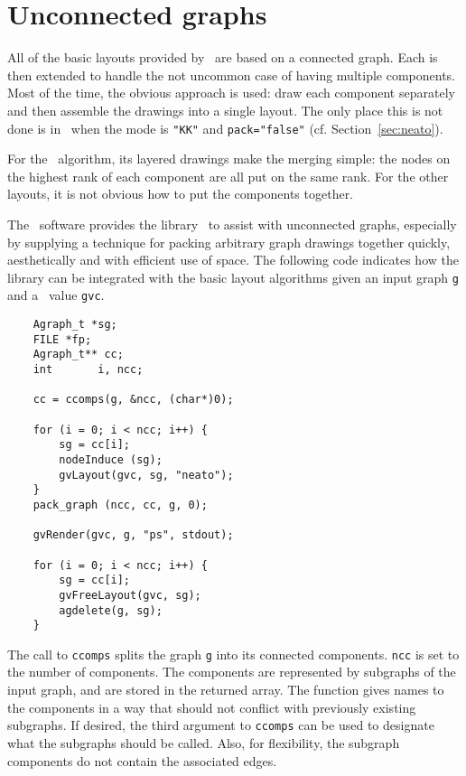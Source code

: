 \section{Unconnected graphs}
\label{sec:unconnect}
All of the basic layouts provided by \gviz\ are based on a connected graph.
Each is then extended to handle the not uncommon case of having
multiple components. Most of the time, the obvious approach is used:
draw each component separately and then assemble the drawings into a single
layout. The only place this is not done is in \neato\ when the mode is
{\tt "KK"} and {\tt pack="false"} (cf. Section~\ref{sec:neato}).

For the \dot\ algorithm, its layered drawings make the merging simple:
the nodes on the highest rank of each component are all put
on the same rank. For the other layouts, it is not obvious how to put
the components together. 

The \gviz\ software provides the library \pack\ to assist
with unconnected graphs, especially by supplying a technique for
packing arbitrary graph drawings together quickly, aesthetically and
with efficient use of space. The following code indicates how the
library can be integrated with the 
basic layout algorithms given an input graph {\tt g} and a \gvc\ value
{\tt gvc}.

\begin{verbatim}
    Agraph_t *sg;
    FILE *fp;
    Agraph_t** cc;
    int       i, ncc;

    cc = ccomps(g, &ncc, (char*)0);

    for (i = 0; i < ncc; i++) {
	    sg = cc[i];
        nodeInduce (sg);
        gvLayout(gvc, sg, "neato");
    }
    pack_graph (ncc, cc, g, 0);

    gvRender(gvc, g, "ps", stdout);

    for (i = 0; i < ncc; i++) {
        sg = cc[i];
        gvFreeLayout(gvc, sg);
        agdelete(g, sg);
    }
\end{verbatim}

The call to {\tt ccomps} splits the graph {\tt g} into its connected
components. {\tt ncc} is set to the number of components. 
The components are represented by subgraphs of the input graph, and are
stored in the returned array. The function gives names to the components
in a way that should not conflict with previously existing subgraphs.
If desired, the third argument to {\tt ccomps} can be used to designate
what the subgraphs should be called. Also, for flexibility, the
subgraph components do not contain the associated edges.

